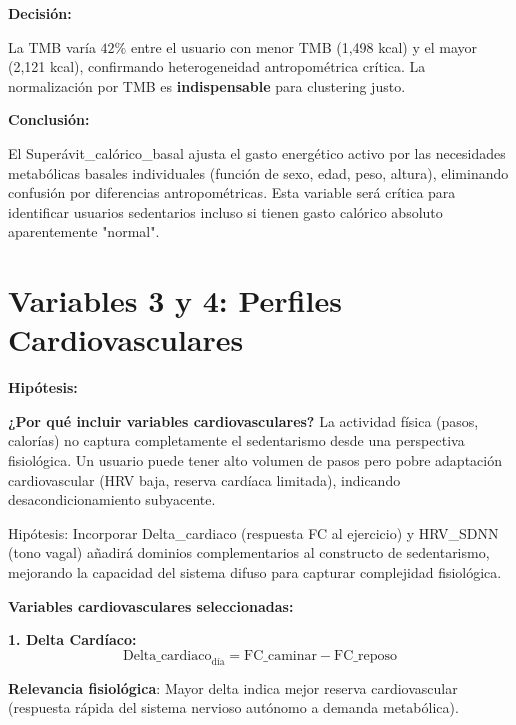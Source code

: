 \documentclass[12pt,letterpaper,twoside]{report}
\begin{document}
\begin{calculobox}
\begin{decisionbox}
\textbf{Decisión:}

La TMB varía $42\%$ entre el usuario con menor TMB (1,498 kcal) y el mayor (2,121 kcal), confirmando heterogeneidad antropométrica crítica. La normalización por TMB es \textbf{indispensable} para clustering justo.
\end{decisionbox}

\begin{conclusionbox}
\textbf{Conclusión:}

El Superávit\_calórico\_basal ajusta el gasto energético activo por las necesidades metabólicas basales individuales (función de sexo, edad, peso, altura), eliminando confusión por diferencias antropométricas. Esta variable será crítica para identificar usuarios sedentarios incluso si tienen gasto calórico absoluto aparentemente "normal".
\end{conclusionbox}

\section{Variables 3 y 4: Perfiles Cardiovasculares}

\begin{hipotesisbox}
\textbf{Hipótesis:}

\textbf{¿Por qué incluir variables cardiovasculares?} La actividad física (pasos, calorías) no captura completamente el sedentarismo desde una perspectiva fisiológica. Un usuario puede tener alto volumen de pasos pero pobre adaptación cardiovascular (HRV baja, reserva cardíaca limitada), indicando desacondicionamiento subyacente.

Hipótesis: Incorporar Delta\_cardiaco (respuesta FC al ejercicio) y HRV\_SDNN (tono vagal) añadirá dominios complementarios al constructo de sedentarismo, mejorando la capacidad del sistema difuso para capturar complejidad fisiológica.
\end{hipotesisbox}

\begin{estadisticobox}
\textbf{Variables cardiovasculares seleccionadas:}

\textbf{1. Delta Cardíaco:}
\begin{equation}
\text{Delta\_cardiaco}_{\text{día}} = \text{FC\_caminar} - \text{FC\_reposo}
\end{equation}

\textbf{Relevancia fisiológica}: Mayor delta indica mejor reserva cardiovascular (respuesta rápida del sistema nervioso autónomo a demanda metabólica).


\end{estadisticobox}
\end{calculobox}
\end{document}
